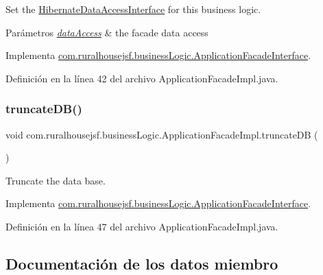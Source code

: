 Set the \mbox{\hyperlink{}{Hibernate\+Data\+Access\+Interface}} for this business logic. 


\begin{DoxyParams}{Parámetros}
{\em \mbox{\hyperlink{a00112}{data\+Access}}} & the facade data access \\
\hline
\end{DoxyParams}


Implementa \mbox{\hyperlink{a00136_a8bb95aa007a4d95b32ed838ae40406c0}{com.\+ruralhousejsf.\+business\+Logic.\+Application\+Facade\+Interface}}.



Definición en la línea 42 del archivo Application\+Facade\+Impl.\+java.

\mbox{\label{a00132_a5fe9f44c95b3459fb8999c26e5b934cb}} 
\subsubsection{\texorpdfstring{truncateDB()}{truncateDB()}}
{\footnotesize\ttfamily void com.\+ruralhousejsf.\+business\+Logic.\+Application\+Facade\+Impl.\+truncate\+DB (\begin{DoxyParamCaption}{ }\end{DoxyParamCaption})}



Truncate the data base. 



Implementa \mbox{\hyperlink{a00136_aeb85aa3c5dd08bc15e08cc0d4c36882e}{com.\+ruralhousejsf.\+business\+Logic.\+Application\+Facade\+Interface}}.



Definición en la línea 47 del archivo Application\+Facade\+Impl.\+java.



\subsection{Documentación de los datos miembro}
\mbox{\label{a00132_a96ac80fe606a4649e5fbbbd24935690a}} 
